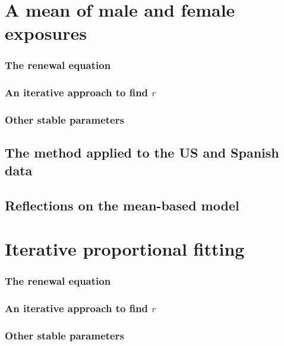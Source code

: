   \chapter{A mean of male and female exposures}
    
      \subsection{The renewal equation}
         
      \subsection{An iterative approach to find $r$}
         
      \subsection{Other stable parameters}
         
      \section{The method applied to the US and Spanish data}
        
      \section{Reflections on the mean-based model}
        
        

  
  \chapter{Iterative proportional fitting}
      
    \subsection{The renewal equation}
      
    \subsection{An iterative approach to find $r$}
      
    \subsection{Other stable parameters}
      
